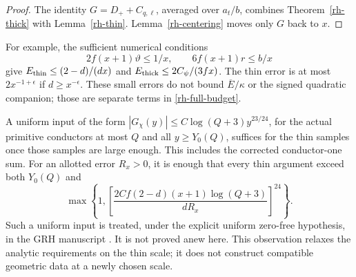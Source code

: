 \begin{proof}
The identity $G=D_++C_{q,\ell}$, averaged over $a_t/b$, combines
Theorem~\ref{rh-thick} with Lemma~\ref{rh-thin}.
Lemma~\ref{rh-centering} moves only $G$ back to $x$.
\end{proof}

For example, the sufficient numerical conditions
\[
 2f(x+1)\vartheta\le1/x,\qquad 6f(x+1)r\le b/x
\]
give
$E_{\rm thin}\le(2-d)/(dx)$ and
$E_{\rm thick}\le2C_\psi/(3fx)$.
The thin error is at most $2x^{-1+\epsilon}$ if $d\ge x^{-\epsilon}$.
These small errors do not bound $\overline E/\kappa$ or the signed
quadratic companion; those are separate terms in \eqref{rh-full-budget}.

A uniform input of the form
$|G_\chi(y)|\le C\log(Q+3)y^{23/24}$, for the actual primitive
conductors at most $Q$ and all $y\ge Y_0(Q)$, suffices for the thin
samples once those samples are large enough. This includes the
corrected conductor-one sum. For an allotted error $R_x>0$, it is
enough that every thin argument exceed both $Y_0(Q)$ and
\[
 \max\left\{1,
 \left[\frac{2Cf(2-d)(x+1)\log(Q+3)}{dR_x}\right]^{24}\right\}.
\]
Such a uniform input is treated, under the explicit uniform zero-free
hypothesis, in the GRH manuscript \cite{rh-companion,rh-qrh}.
It is not proved anew here. This observation relaxes the analytic
requirements on the thin scale; it does not construct compatible
geometric data at a newly chosen scale.
